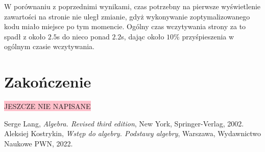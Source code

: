 \documentclass[licencjacka]{pracadypl}
\newcommand{\selfnote}[1]{\colorbox{pink}{#1}}
\begin{document}
W porównaniu z poprzednimi wynikami, czas potrzebny na pierwsze wyświetlenie zawartości na stronie nie uległ zmianie, gdyż wykonywanie zoptymalizowanego kodu miało miejsce po tym momencie. Ogólny czas wczytywania strony za to spadł z około $2.5$s do nieco ponad $2.2$s, dając około $10\%$ przyśpieszenia w ogólnym czasie wczytywania.

\chapter{Zakończenie}

\selfnote{JESZCZE NIE NAPISANE}

\begin{thebibliography}{7}
%
Serge Lang, 
\textit{Algebra. Revised third edition}, 
New York, Springer-Verlag, 2002.
%
Aleksiej Kostrykin, 
\textit{Wstęp do algebry. Podstawy algebry},
Warszawa, Wydawnictwo Naukowe PWN, 2022.
\end{thebibliography}
\end{document}
